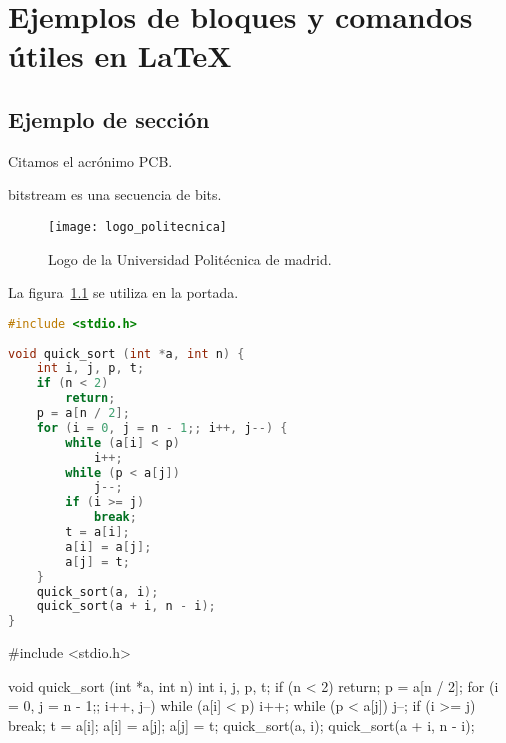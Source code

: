 \chapter{Ejemplos de bloques y comandos útiles en LaTeX\label{sec:ejemplos}}
\section{Ejemplo de sección}

%
%


Citamos el acrónimo \gls{PCB}.

\Gls{bitstream} es una secuencia de bits.

\begin{figure}[htp!]
  \centering
  \texttt{[image: logo\_politecnica]}
  \caption{Logo de la Universidad Politécnica de madrid.}
  \label{fig:logo_uam}
\end{figure} 

La figura~\ref{fig:logo_uam} se utiliza en la portada.

\clearpage

\begin{lstlisting}[label=algoritmo:quicksort,language=C,frame=single,caption=Algoritmo de ordenación Quicksort]
#include <stdio.h>
 
void quick_sort (int *a, int n) {
    int i, j, p, t;
    if (n < 2)
        return;
    p = a[n / 2];
    for (i = 0, j = n - 1;; i++, j--) {
        while (a[i] < p)
            i++;
        while (p < a[j])
            j--;
        if (i >= j)
            break;
        t = a[i];
        a[i] = a[j];
        a[j] = t;
    }
    quick_sort(a, i);
    quick_sort(a + i, n - i);
}
\end{lstlisting}

\begin{code}
#include <stdio.h>
 
void quick_sort (int *a, int n) {
    int i, j, p, t;
    if (n < 2)
        return;
    p = a[n / 2];
    for (i = 0, j = n - 1;; i++, j--) {
        while (a[i] < p)
            i++;
        while (p < a[j])
            j--;
        if (i >= j)
            break;
        t = a[i];
        a[i] = a[j];
        a[j] = t;
    }
    quick_sort(a, i);
    quick_sort(a + i, n - i);
}
\end{code}

